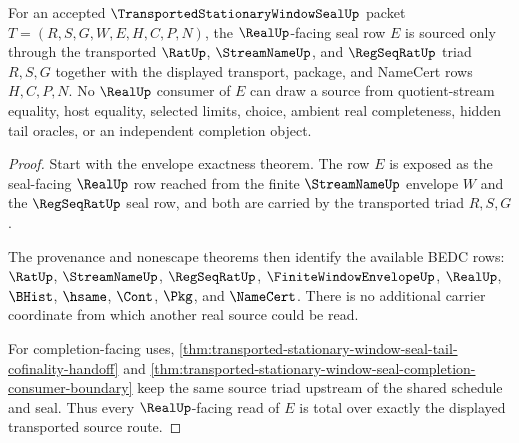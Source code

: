 \begin{theorem}
\label{thm:transported-stationary-window-seal-real-regseqrat-source-totality}
For an accepted $\TransportedStationaryWindowSealUp$ packet $T=(R,S,G,W,E,H,C,P,N)$, the $\RealUp$-facing seal row $E$ is sourced only through the transported $\RatUp$, $\StreamNameUp$, and $\RegSeqRatUp$ triad $R,S,G$ together with the displayed transport, package, and NameCert rows $H,C,P,N$. No $\RealUp$ consumer of $E$ can draw a source from quotient-stream equality, host equality, selected limits, choice, ambient real completeness, hidden tail oracles, or an independent completion object.
\end{theorem}
\begin{proof}
Start with the envelope exactness theorem. The row $E$ is exposed as the seal-facing $\RealUp$ row reached from the finite $\StreamNameUp$ envelope $W$ and the $\RegSeqRatUp$ seal row, and both are carried by the transported triad $R,S,G$.

The provenance and nonescape theorems then identify the available BEDC rows: $\RatUp$, $\StreamNameUp$, $\RegSeqRatUp$, $\FiniteWindowEnvelopeUp$, $\RealUp$, $\BHist$, $\hsame$, $\Cont$, $\Pkg$, and $\NameCert$. There is no additional carrier coordinate from which another real source could be read.

For completion-facing uses, \autoref{thm:transported-stationary-window-seal-tail-cofinality-handoff} and \autoref{thm:transported-stationary-window-seal-completion-consumer-boundary} keep the same source triad upstream of the shared schedule and seal. Thus every $\RealUp$-facing read of $E$ is total over exactly the displayed transported source route.
\end{proof}

